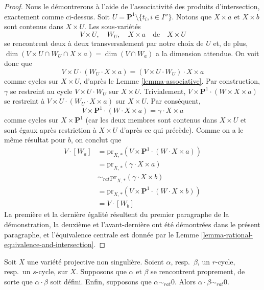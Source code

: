 \begin{proof}
\medskip\noindent
Nous le démontrerons à l'aide de l'associativité des produits d'intersection, exactement
comme ci-dessus. Soit $U = \mathbf{P}^1 \setminus \{t_i, i \in I''\}$.
Notons que $X \times a$ et $X \times b$ sont contenus dans $X \times U$.
Les sous-variétés
$$
V \times U,\quad W_U,\quad X \times a\quad\text{de}\quad X \times U
$$
se rencontrent deux à deux transversalement par notre choix de $U$ et, de plus,
$\dim(V \times U \cap W_U \cap X \times a) = \dim(V \cap W_a)$ a
la dimension attendue. On voit donc que
$$
V \times U \cdot (W_U \cdot X \times a) =
(V \times U \cdot W_U) \cdot X \times a
$$
comme cycles sur $X \times U$, d'après le Lemme \ref{lemma-associative}.
Par construction, $\gamma$ se restreint au cycle $V \times U \cdot W_U$
sur $X \times U$. Trivialement,
$V \times \mathbf{P}^1 \cdot (W \times X \times a)$ se restreint
à $V \times U \cdot (W_U \cdot X \times a)$ sur $X \times U$.
Par conséquent,
$$
V \times \mathbf{P}^1 \cdot (W \cdot X \times a) =
\gamma \cdot X \times a
$$
comme cycles sur $X \times \mathbf{P}^1$ (car les deux membres
sont contenus dans $X \times U$ et sont égaux après restriction
à $X \times U$ d'après ce qui précède). Comme on a le même résultat pour $b$,
on conclut que
\begin{align*}
V \cdot [W_a]
& =
\text{pr}_{X,*}(V \times \mathbf{P}^1 \cdot (W \cdot X\times a)) \\
& =
\text{pr}_{X, *}(\gamma \cdot X \times a) \\
& \sim_{rat} 
\text{pr}_{X, *}(\gamma \cdot X \times b) \\
& =
\text{pr}_{X,*}(V \times \mathbf{P}^1 \cdot (W \cdot X\times b)) \\
& =
V \cdot [W_b]
\end{align*}
La première et la dernière égalité résultent du premier paragraphe de la démonstration,
la deuxième et l'avant-dernière ont été démontrées dans le présent paragraphe, et
l'équivalence centrale est donnée par le
Lemme \ref{lemma-rational-equivalence-and-intersection}.
\end{proof}

\begin{theorem}
\label{theorem-well-defined}
Soit $X$ une variété projective non singulière. Soient $\alpha$, resp.\ $\beta$,
un $r$-cycle, resp.\ un $s$-cycle, sur $X$. Supposons que $\alpha$ et $\beta$
se rencontrent proprement, de sorte que $\alpha \cdot \beta$ soit défini. Enfin,
supposons que $\alpha \sim_{rat} 0$. Alors $\alpha \cdot \beta \sim_{rat} 0$.
\end{theorem}

